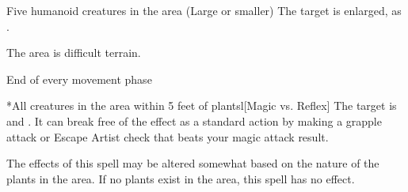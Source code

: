 \begin{spellheader}
    \spelldur{\durshort \dismissable}
\end{spellheader}
\begin{spelleffects}
    \begin{spelltarget}{Five humanoid creatures in the area (Large or smaller)}
        \spelleffect The target is enlarged, as .
    \end{spelltarget}
\end{spelleffects}
\begin{spellfooter}
    
\end{spellfooter}

\begin{spellheader}
    \spelldur{\durshort \dismissable}
\end{spellheader}
\begin{spelleffects}
    \spelleffect The area is difficult terrain.
    \begin{spelltrigger}{End of every movement phase}
        \begin{spelltarget}*{All creatures in the area within 5 feet of plants}l[Magic vs. Reflex]
            \spellsuccess The target is \entangled and \immobilized. It can break free of the effect as a standard action by making a grapple attack or Escape Artist check that beats your magic attack result.
        \end{spelltarget}
    \end{spelltrigger}
\end{spelleffects}
\begin{spellfooter}
    \spellnotes The effects of this spell may be altered somewhat based on the nature of the plants in the area. If no plants exist in the area, this spell has no effect.
\end{spellfooter}

